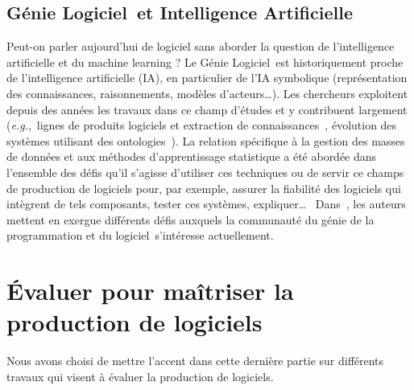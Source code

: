 \documentclass[11pt]{article}
\newcommand{\mynote}[3][black]{\textcolor{#1}{\fbox{\bfseries\sffamily\scriptsize{#2}}
{\small$\blacktriangleright$\textsf{\emph{#3}}$\blacktriangleleft$}}}
\newcommand{\TODO}[1]{\mynote[red]{TODO}{#1}}
\newcommand{\gpl}[0]{génie de la programmation et du logiciel\xspace}
\newcommand{\GL}[0]{Génie Logiciel\xspace}
\newcommand{\eg}[0]{\emph{e.g.},~}
\begin{document}




\subsection{\GL~et Intelligence Artificielle\label{ss:maintenance:IA}}
Peut-on parler aujourd'hui de logiciel sans aborder la question de l'intelligence artificielle et du machine learning ?
Le \GL~est historiquement proche de l'intelligence artificielle (IA), en particulier de l'IA symbolique (représentation des connaissances, raisonnements, modèles d'acteurs\ldots). Les chercheurs exploitent depuis des années les travaux dans ce champ d'études et y contribuent largement (\eg lignes de produits logiciels  et extraction de connaissances~\cite{Carbonnel2020}, évolution des systèmes utilisant des ontologies~\cite{Quinton2020}). La relation spécifique à la gestion des masses de données et aux méthodes d'apprentissage statistique a été abordée dans l'ensemble des défis qu'il s'agisse d'utiliser ces techniques ou de servir ce champs de production de logiciels pour, par exemple, assurer la fiabilité des logiciels qui intègrent de tels composants, tester ces systèmes, expliquer\ldots~
Dans~\cite{IA}, les auteurs mettent en exergue différents défis auxquels la communauté du \gpl~s'intéresse actuellement.

\section{Évaluer pour maîtriser la production de logiciels \label{s:evaluation}}
Nous avons choisi de mettre l'accent dans cette dernière partie sur différents travaux qui visent à évaluer la production de logiciels.
\end{document}

